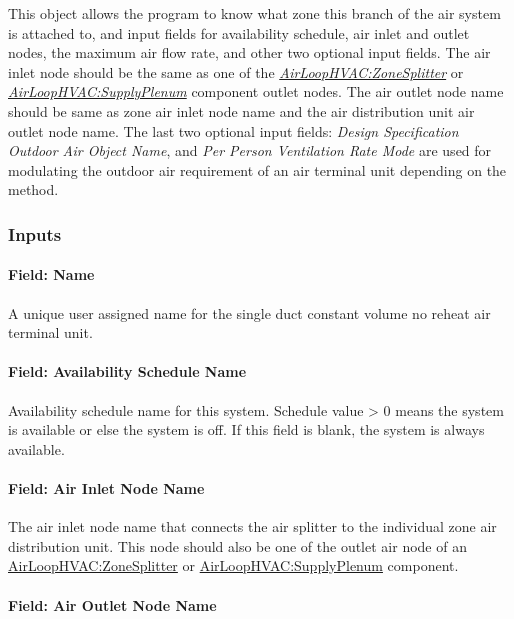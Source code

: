 This object allows the program to know what zone this branch of the air system is attached to, and input fields for availability schedule, air inlet and outlet nodes, the maximum air flow rate, and other two optional input fields. The air inlet node should be the same as one of the \emph{\hyperref[airloophvaczonesplitter]{AirLoopHVAC:ZoneSplitter}} or \emph{\hyperref[airloophvacsupplyplenum]{AirLoopHVAC:SupplyPlenum}} component  outlet nodes. The air outlet node name should be same as zone air inlet node name and the air distribution unit air outlet node name. The last two optional input fields: \textit{Design Specification Outdoor Air Object Name}, and \textit{Per Person Ventilation Rate Mode} are used for modulating the outdoor air requirement of an air terminal unit depending on the method.

\subsubsection{Inputs}\label{inputs-1-001}

\paragraph{Field: Name}\label{field-name-1-000}

A unique user assigned name for the single duct constant volume no reheat air terminal unit.

\paragraph{Field: Availability Schedule Name}\label{field-availability-schedule-name-1}

Availability schedule name for this system. Schedule value > 0 means the system is available or else the system is off. If this field is blank, the system is always available.

\paragraph{Field: Air Inlet Node Name}\label{field-air-inlet-node-name}

The air inlet node name that connects the air splitter to the individual zone air distribution unit. This node should also be one of the outlet air node of an \hyperref[airloophvaczonesplitter]{AirLoopHVAC:ZoneSplitter} or \hyperref[airloophvacsupplyplenum]{AirLoopHVAC:SupplyPlenum} component.

\paragraph{Field: Air Outlet Node Name}\label{field-air-outlet-node-name}

